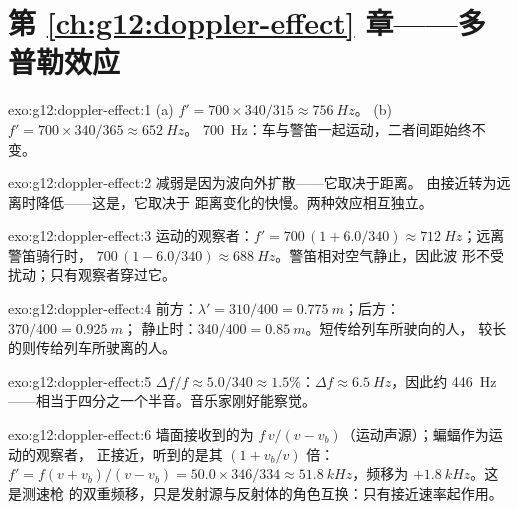 \section*{第 \ref{ch:g12:doppler-effect} 章——多普勒效应}

\begin{solution}{exo:g12:doppler-effect:1}
(a) $f' = 700 \times 340/315 \approx \qty{756}{Hz}$。
(b) $f' = 700 \times 340/365 \approx \qty{652}{Hz}$。
\qty{700}{Hz}：车与警笛一起运动，二者间距始终不变。
\end{solution}

\begin{solution}{exo:g12:doppler-effect:2}
\emph{}减弱是因为波向外扩散——它取决于距离。
\emph{}由接近转为远离时降低——这是，它取决于
距离变化的快慢。两种效应相互独立。
\end{solution}

\begin{solution}{exo:g12:doppler-effect:3}
运动的观察者：$f' = 700\,(1 + 6.0/340) \approx \qty{712}{Hz}$；远离警笛骑行时，
$700\,(1 - 6.0/340) \approx \qty{688}{Hz}$。警笛相对空气静止，因此波
形不受扰动；只有观察者穿过它。
\end{solution}

\begin{solution}{exo:g12:doppler-effect:4}
前方：$\lambda' = 310/400 = \qty{0.775}{m}$；后方：$370/400 = \qty{0.925}{m}$；
静止时：$340/400 = \qty{0.85}{m}$。短传给列车所驶向的人，
较长的则传给列车所驶离的人。
\end{solution}

\begin{solution}{exo:g12:doppler-effect:5}
$\Delta f/f \approx 5.0/340 \approx 1.5\%$：$\Delta f \approx \qty{6.5}{Hz}$，因此约
\qty{446}{Hz}——相当于四分之一个半音。音乐家刚好能察觉。
\end{solution}

\begin{solution}{exo:g12:doppler-effect:6}
墙面接收到的为 $f\,v/(v - v_b)$（运动声源）；蝙蝠作为运动的观察者，
正接近，听到的是其 $(1 + v_b/v)$ 倍：$f' = f(v + v_b)/(v - v_b) = 50.0 \times
346/334 \approx \qty{51.8}{kHz}$，频移为 $+\qty{1.8}{kHz}$。这是测速枪
的双重频移，只是发射源与反射体的角色互换：只有接近速率起作用。
\end{solution}

